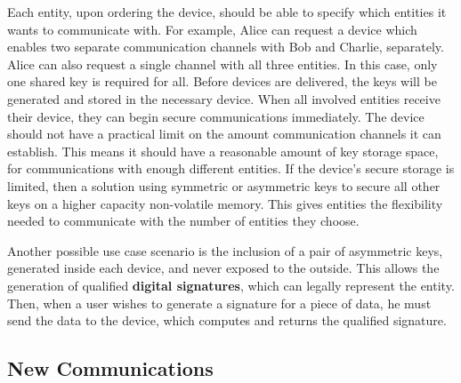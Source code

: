 Each entity, upon ordering the device, should be able to specify which entities it wants to communicate with.
For example, Alice can request a device which enables two separate communication channels with Bob and Charlie, separately. Alice can also request a single channel with all three entities. In this case, only one shared key is required for all.
Before devices are delivered, the keys will be generated and stored in the necessary device. When all involved entities receive their device, they can begin secure communications immediately.
The device should not have a practical limit on the amount communication channels it can establish. This means it should have a reasonable amount of key storage space, for communications with enough different entities.
If the device's secure storage is limited, then a solution using symmetric or asymmetric keys to secure all other keys on a higher capacity non-volatile memory.
This gives entities the flexibility needed to communicate with the number of entities they choose.

Another possible use case scenario is the inclusion of a pair of asymmetric keys, generated inside each device, and never exposed to the outside. This allows the generation of qualified \textbf{digital signatures}, which can legally represent the entity.
Then, when a user wishes to generate a signature for a piece of data, he must send the data to the device, which computes and returns the qualified signature.


\subsection{New Communications}\label{chap:problem:scenarios:keys}

